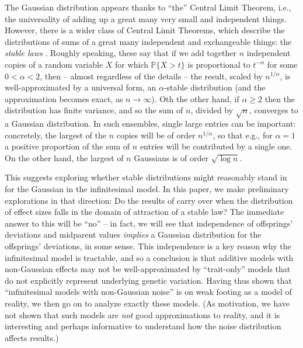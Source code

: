 \documentclass{article}
\renewcommand{\P}{\mathbb{P}}
\newcommand{\1}{\mathbbm{1}}
\theoremstyle{remark}
\theoremstyle{definition}
\begin{document}
The Gaussian distribution appears thanks to ``the'' Central Limit Theorem,
i.e., the universality of adding up a great many very small and independent things.
However, there is a wider class of Central Limit Theorems,
which describe the distributions of sums of a great many independent and exchangeable things:
the \emph{stable laws} \citep{gnedenko1968limit}.
Roughly speaking, these say that if we add together $n$ independent copies of a random variable $X$
for which $\P\{ X > t \}$ is proportional to $t^{-\alpha}$ for some $0 < \alpha < 2$,
then -- almost regardless of the details -- the result, scaled by $n^{1/\alpha}$,
is well-approximated by a universal form, an $\alpha$-stable distribution
(and the approximation becomes exact, as $n \to \infty$).
Oth the other hand, if $\alpha \ge 2$ then the distribution has finite variance,
and so the sum of $n$, divided by $\sqrt{n}$, converges to a Gaussian distribution.
In such ensembles, single large entries can be important:
concretely, the largest of the $n$ copies will be of order $n^{1/\alpha}$,
so that e.g., for $\alpha=1$ a positive proportion of the sum of $n$ entries will be contributed by a single one.
On the other hand, the largest of $n$ Gaussians is of order $\sqrt{\log n}$.  

This suggests exploring whether stable distributions might reasonably stand in for the Gaussian
in the infinitesimal model. 
In this paper, we make preliminary explorations in that direction:
Do the results of \citet{barton2017infinitesimal}
carry over when the distribution of effect sizes falls in the domain of attraction of a stable law?
The immediate answer to this will be ``no'' --
in fact, we will see that independence of offsprings' deviations and midparent values \emph{implies} a Gaussian distribution for the offsprings' deviations, in some sense. 
This independence is a key reason why the infinitesimal model is tractable,
and so a conclusion is that additive models with non-Gaussian effects may not be well-approximated
by ``trait-only'' models that do not explicitly represent underlying genetic variation.
Having thus shown that ``infinitesimal models with non-Gaussian noise'' is on weak footing as a model of reality,
we then go on to analyze exactly these models.
(As motivation,
we have not shown that such models are \emph{not} good approximations to reality,
and it is interesting and perhaps informative to understand how the noise distribution affects results.)
\end{document}
